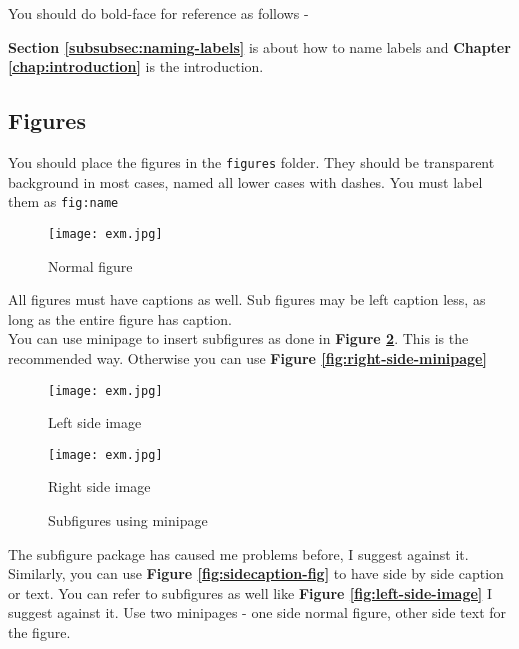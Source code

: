 You should do bold-face for reference as follows -

\textbf{Section \ref{subsubsec:naming-labels}} is about how to name labels and \textbf{Chapter \ref{chap:introduction}} is the introduction.

\subsection{Figures}

You should place the figures in the \texttt{figures} folder. They should be transparent background in most cases, named all lower cases with dashes. You must label them as \texttt{fig:name}\\

\begin{figure}[!hbt]
  	\centering
 	\texttt{[image: exm.jpg]}
  	\caption{Normal figure}
 	\label{fig:normal-figure}
\end{figure}

All figures must have captions as well. Sub figures may be left caption less, as long as the entire figure has caption.\\

You can use minipage to insert subfigures as done in \textbf{Figure \ref{fig:subfig-minipage}}. This is the recommended way. Otherwise you can use \textbf{Figure \ref{fig:right-side-minipage}}\\

\begin{figure}[!htb]
    \centering
    \begin{minipage}{.5\textwidth}
        \centering
        \texttt{[image: exm.jpg]}
        \caption{Left side image}
        \label{fig:left side minipage}
    \end{minipage}%
    \begin{minipage}{0.5\textwidth}
        \centering
        \texttt{[image: exm.jpg]}
        \caption{Right side image}
        \label{fig:right-side-minipage}
    \end{minipage}
    \caption{Subfigures using minipage}
    \label{fig:subfig-minipage}
\end{figure}

The subfigure package has caused me problems before, I suggest against it. Similarly, you can use \textbf{Figure \ref{fig:sidecaption-fig}} to have side by side caption or text. You can refer to subfigures as well like \textbf{Figure \ref{fig:left-side-image}} I suggest against it. Use two minipages - one side normal figure, other side text for the figure.

